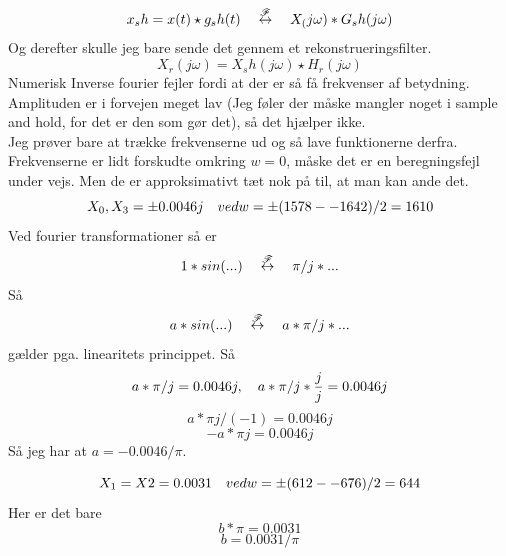 \begin{Opgaver}
\begin{kapitel}
\begin{Opgave}
\begin{UnderOpgave}
                \[x_sh = x(t)\star g_sh(t) \transformation{F} X_(j\omega)*G_sh(j\omega)\]
                Og derefter skulle jeg bare sende det gennem et rekonstrueringsfilter.
                \[X_r(j\omega) = X_sh(j\omega)\star H_r(j\omega)\]
                Numerisk Inverse fourier fejler fordi at der er så få frekvenser af betydning. \\
                Amplituden er i forvejen meget lav (Jeg føler der måske mangler noget i sample and hold, for det er den som gør det), så det hjælper ikke.\\
                Jeg prøver bare at trække frekvenserne ud og så lave funktionerne derfra. 
                Frekvenserne er lidt forskudte omkring $w = 0$, måske det er en beregningsfejl under vejs. Men de er approksimativt tæt nok på til, at man kan ande det.
                \[X_0, X_3 = \pm 0.0046j \tab{0} ved w = \pm (1578 - -1642)/2 = 1610\]
                Ved fourier transformationer så er 
                \[1 * sin(...) \transformation{F} \pi/j * ... \]
                Så
                \[a * sin(...) \transformation{F} a * \pi/j * ... \]
                gælder pga. linearitets princippet. Så
                \[a * \pi /j = 0.0046j, \tab{0} a * \pi /j * \frac{j}{j} = 0.0046j\]
                \[a * \pi j /(-1) = 0.0046j\]
                \[-a * \pi j = 0.0046j\]
                Så jeg har at $a = -0.0046/\pi$. 

                \[X_1 = X2 = 0.0031 \tab{0} ved w = \pm (612 - -676)/2 = 644\]
                Her er det bare 
                \[b * \pi = 0.0031\]
                \[b = 0.0031/\pi\]


\end{UnderOpgave}
\end{Opgave}
\end{kapitel}
\end{Opgaver}
